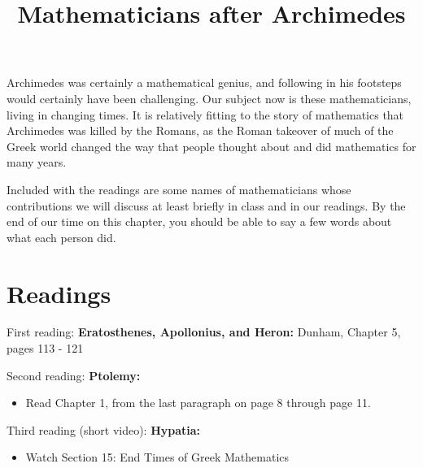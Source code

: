 \documentclass[nooutcomes]{ximera}
\title{Mathematicians after Archimedes}
\begin{document}
\begin{abstract}
    
\end{abstract}
\maketitle

Archimedes was certainly a mathematical genius, and following in his footsteps would certainly have been challenging.  Our subject now is these mathematicians, living in changing times.  It is relatively fitting to the story of mathematics that Archimedes was killed by the Romans, as the Roman takeover of much of the Greek world changed the way that people thought about and did mathematics for many years.

Included with the readings are some names of mathematicians whose contributions we will discuss at least briefly in class and in our readings.  By the end of our time on this chapter, you should be able to say a few words about what each person did.




\section{Readings}
First reading: {\bf Eratosthenes, Apollonius, and Heron:} Dunham, Chapter 5, pages 113 - 121 


Second reading: {\bf Ptolemy:} 
\begin{itemize}
	\item Read Chapter 1, from the last paragraph on page 8 through page 11.
\end{itemize}

Third reading (short video): {\bf Hypatia:}  

\begin{itemize}
\item Watch Section 15: End Times of Greek Mathematics
\end{itemize}
\end{document}
